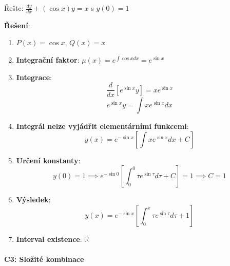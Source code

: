 \vspace{0.6\baselineskip}

\begin{example}
Řešte: $\frac{dy}{dx} + (\cos x)y = x$ s $y(0) = 1$
\vspace{0.3\baselineskip}

\textbf{Řešení}: 
\begin{enumerate}
\item $P(x) = \cos x$, $Q(x) = x$

\item \textbf{Integrační faktor}: $\mu(x) = e^{\int \cos x  dx} = e^{\sin x}$

\item \textbf{Integrace}:
\[
\frac{d}{dx}[e^{\sin x}y] = xe^{\sin x}
\]
\[
e^{\sin x}y = \int xe^{\sin x}dx
\]

\item \textbf{Integrál nelze vyjádřit elementárními funkcemi}:
\[
y(x) = e^{-\sin x}\left[\int xe^{\sin x}dx + C\right]
\]

\item \textbf{Určení konstanty}:
\[
y(0) = 1 \implies e^{-\sin 0}\left[\int_0^0 \tau e^{\sin \tau}d\tau + C\right] = 1 \implies C = 1
\]

\item \textbf{Výsledek}:
\[
y(x) = e^{-\sin x}\left[\int_0^x \tau e^{\sin \tau}d\tau + 1\right]
\]

\item \textbf{Interval existence}: $\mathbb{R}$
\end{enumerate}
\end{example}

\vspace{0.8\baselineskip}

\paragraph*{C3: Složité kombinace}


